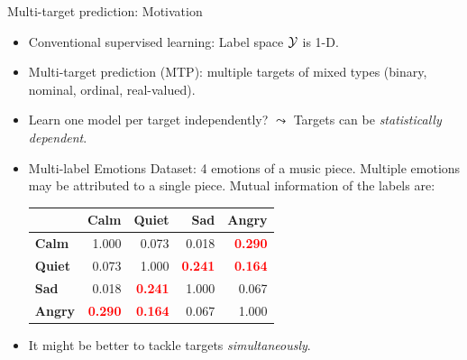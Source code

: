 \documentclass[11pt,compress,t,notes=noshow, xcolor=table]{beamer}
\begin{document}



\sloppy

\begin{vbframe}{Multi-target prediction: Motivation}
    \begin{itemize}    
        \item Conventional supervised learning: Label space $\mathcal{Y}$ is 1-D.	

        \item Multi-target prediction (MTP): multiple targets of mixed types (binary, nominal, ordinal, real-valued).
        
        \item Learn one model per target independently? $\leadsto$ Targets can be \emph{statistically dependent}.

        \item Multi-label Emotions Dataset: 4 emotions of a music piece. Multiple emotions may be attributed to a single piece. Mutual information of the labels are:
        \begin{center}
            \begin{tabular}{lrrrr}
            \toprule
              & \textbf{Calm} & \textbf{Quiet} & \textbf{Sad} & \textbf{Angry}\\
            \midrule
            \textbf{Calm} & 1.000 & 0.073 & 0.018 & \textcolor{red}{\textbf{0.290}}\\
            \textbf{Quiet} & 0.073 & 1.000 & \textcolor{red}{\textbf{0.241}} & \textcolor{red}{\textbf{0.164}}\\
            \textbf{Sad} & 0.018 & \textcolor{red}{\textbf{0.241}} & 1.000 & 0.067\\
            \textbf{Angry} & \textcolor{red}{\textbf{0.290}} & \textcolor{red}{\textbf{0.164}} & 0.067 & 1.000\\
            \bottomrule
        \end{tabular}
        \end{center}
        
		\item It might be better to tackle targets \emph{simultaneously}.
    \end{itemize}

\end{vbframe}
\end{document}
